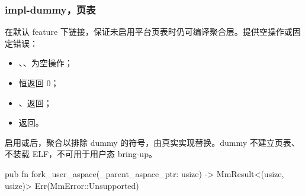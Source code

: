 
\subsubsection{impl-dummy，页表}

在默认 feature 下链接，保证未启用平台页表时仍可编译聚合层。提供空操作或固定错误：

\begin{itemize}
 \item {}、、为空操作；
 \item {}恒返回 0；
 \item {}、返回；
 \item {}返回。
\end{itemize}

启用或后，聚合以排除 dummy 的符号，由真实实现替换。dummy 不建立页表、不装载 ELF，不可用于用户态 bring-up。

\begin{rustcode}
pub fn fork_user_aspace(_parent_aspace_ptr: usize) -> MmResult<(usize, usize)> {
    Err(MmError::Unsupported)
}
\end{rustcode}
